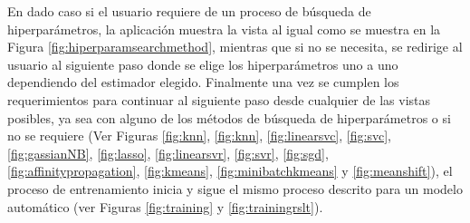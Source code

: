 En dado caso si el usuario requiere de un proceso de búsqueda de hiperparámetros, la aplicación muestra la vista al igual como se muestra en la Figura \ref{fig:hiperparamsearchmethod}, mientras que si no se necesita, se redirige al usuario al siguiente paso donde se elige los hiperparámetros uno a uno dependiendo del estimador elegido. Finalmente una vez se cumplen los requerimientos para continuar al siguiente paso desde cualquier de las vistas posibles, ya sea con alguno de los métodos de búsqueda de hiperparámetros o si no se requiere (Ver Figuras \ref{fig:knn}, \ref{fig:knn}, \ref{fig:linearsvc}, \ref{fig:svc}, \ref{fig:gassianNB}, \ref{fig:lasso}, \ref{fig:linearsvr}, \ref{fig:svr}, \ref{fig:sgd}, \ref{fig:affinitypropagation}, \ref{fig:kmeans}, \ref{fig:minibatchkmeans} y \ref{fig:meanshift}), el proceso de entrenamiento inicia y sigue el mismo proceso descrito para un modelo automático (ver Figuras \ref{fig:training} y \ref{fig:trainingrslt}).
